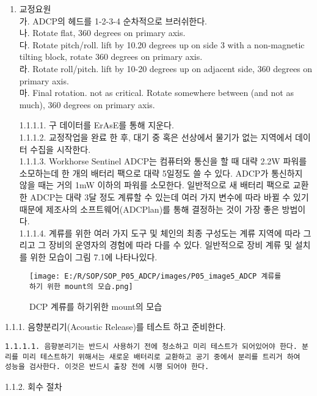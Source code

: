 \documentclass[
]{book}
\begin{document}
\begin{enumerate}
\def\labelenumi{(\arabic{enumi})}
\item
  교정요원\\
  가. ADCP의 헤드를 1-2-3-4 순차적으로 브러쉬한다.\\
  나. Rotate flat, 360 degrees on primary axis.\\
  다. Rotate pitch/roll. lift by 10.20 degrees up on side 3 with a non-magnetic tilting block, rotate 360 degrees on primary axis.\\
  라. Rotate roll/pitch. lift by 10-20 degrees up on adjacent side, 360 degrees on primary axis.\\
  마. Final rotation. not as critical. Rotate somewhere between (and not as much), 360 degrees on primary axis.

  1.1.1.1. 구 데이터를 ErAsE를 통해 지운다.\\
  1.1.1.2. 교정작업을 완료 한 후, 대기 중 혹은 선상에서 물기가 없는 지역에서 데이터 수집을 시작한다.\\
  1.1.1.3. Workhorse Sentinel ADCP는 컴퓨터와 통신을 할 때 대략 2.2W 파워를 소모하는데 한 개의 배터리 팩으로 대략 5일정도 쓸 수 있다. ADCP가 통신하지 않을 때는 거의 1mW 이하의 파워를 소모한다. 일반적으로 새 배터리 팩으로 교환한 ADCP는 대략 3달 정도 계류할 수 있는데 여러 가지 변수에 따라 바뀔 수 있기 때문에 제조사의 소프트웨어(ADCPlan)를 통해 결정하는 것이 가장 좋은 방법이다.\\
  1.1.1.4. 계류를 위한 여러 가지 도구 및 체인의 최종 구성도는 계류 지역에 따라 그리고 그 장비의 운영자의 경험에 따라 다를 수 있다. 일반적으로 장비 계류 및 설치를 위한 모습이 그림 7.1에 나타나있다.
\end{enumerate}

\begin{figure}
\centering
\texttt{[image: E:/R/SOP/SOP\_P05\_ADCP/images/P05\_image5\_ADCP 계류를 하기 위한 mount의 모습.png]}
\caption{DCP 계류를 하기위한 mount의 모습}
\end{figure}

1.1.1. 음향분리기(Acoustic Release)를 테스트 하고 준비한다.

\begin{verbatim}
1.1.1.1. 음향분리기는 반드시 사용하기 전에 청소하고 미리 테스트가 되어있어야 한다. 분리를 미리 테스트하기 위해서는 새로운 배터리로 교환하고 공기 중에서 분리를 트리거 하여  성능을 검사한다. 이것은 반드시 출장 전에 시행 되어야 한다. 
\end{verbatim}

1.1.2. 회수 절차
\end{document}
